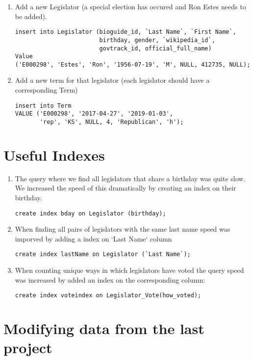 \documentclass[11pt]{article}
\begin{document}
\begin{enumerate}
\item Add a new Legislator (a special election has occured and Ron Estes needs to be added).
\begin{verbatim}
insert into Legislator (bioguide_id, `Last Name`, `First Name`, 
                        birthday, gender, `wikipedia_id`, 
                        govtrack_id, official_full_name)     
Value     
('E000298', 'Estes', 'Ron', '1956-07-19', 'M', NULL, 412735, NULL);
\end{verbatim}

\item Add a new term for that legislator (each legislator should have a corresponding Term)
\begin{verbatim}
insert into Term 
VALUE ('E000298', '2017-04-27', '2019-01-03', 
       'rep', 'KS', NULL, 4, 'Republican', 'h');
\end{verbatim}
\end{enumerate}

\section{Useful Indexes}
\label{sec-3}

\begin{enumerate}
\item The query where we find all legislators that share a birthday was quite slow.
We increased the speed of this dramatically by creating an index on their birthday.
\begin{verbatim}
create index bday on Legislator (birthday);
\end{verbatim}

\item When finding all pairs of legislators with the same last name speed was
imporved by adding a index on `Last Name` column
\begin{verbatim}
create index lastName on Legislator (`Last Name`);
\end{verbatim}

\item When counting unique ways in which legislators have voted the query speed
was increased by added an index on the corresponding column:
\begin{verbatim}
create index voteindex on Legislator_Vote(how_voted);
\end{verbatim}
\end{enumerate}

\section{Modifying data from the last project}
\label{sec-4}
\end{document}
